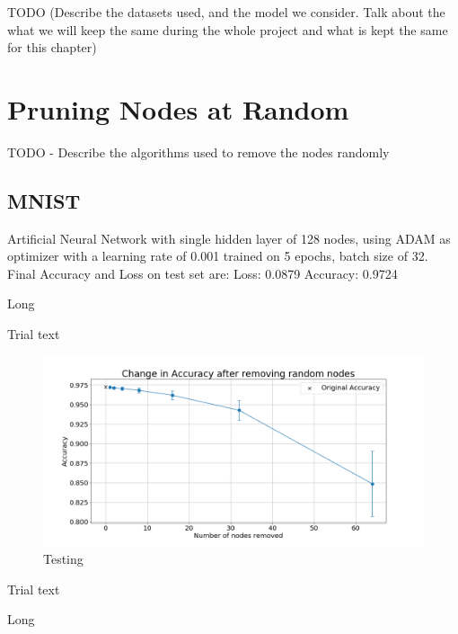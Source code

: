 \documentclass[UKenglish]{ifimaster}
\begin{document}
    TODO (Describe the datasets used, and the model we consider. Talk about the what we will keep the same during the whole project and what
    is kept the same for this chapter)
    \section{Pruning Nodes at Random}
        TODO - Describe the algorithms used to remove the nodes randomly

        \subsection{MNIST}
            Artificial Neural Network with single hidden layer of 128 nodes, using ADAM as optimizer with a learning rate of 0.001 trained on 5 epochs, batch size of 32.
            Final Accuracy and Loss on test set are:
            Loss: 0.0879
            Accuracy: 0.9724

            \begin{table}[h!]
                \centering
                \resizebox{\textwidth}{!}{}
                \caption[Short]{Long}
                \label{tab:ac_rnd_rem_mnist}
            \end{table}

            Trial text

            \begin{figure}[h!]\centering
                \includegraphics[width=\textwidth]{Accuracy_change_random_removal_mnist.png}
                \caption[Short title]{Testing}
                \label{fig:acc_rn_mnist}
            \end{figure}

            Trial text

            \begin{table}[h!]
                \centering
                \resizebox{\textwidth}{!}{}
                \caption[Short]{Long}
                \label{tab:loss_rnd_rem_mnist}
            \end{table}
\end{document}
